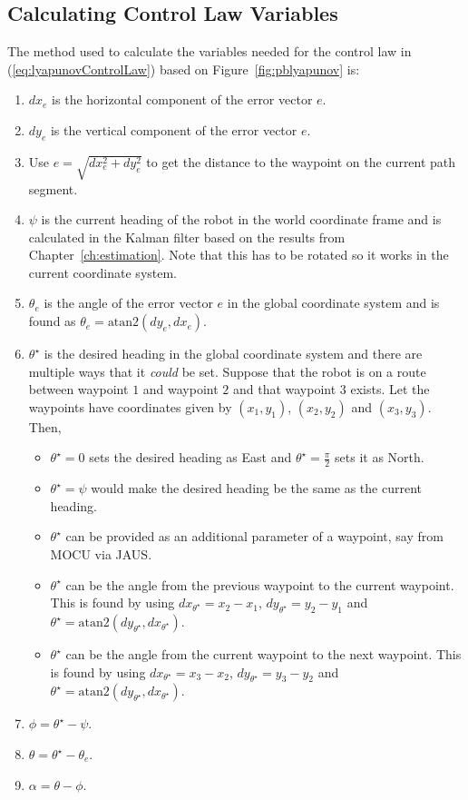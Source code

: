 \subsection{Calculating Control Law Variables}%
\label{sec:lyapunovVariables}
The method used to calculate the variables needed for the control law in (\ref{eq:lyapunovControlLaw}) based on Figure~\ref{fig:pblyapunov} is:
\begin{enumerate}
\item $dx_e$ is the horizontal component of the error vector $e$.
\item $dy_e$ is the vertical component of the error vector $e$.
\item Use $e = \sqrt{dx_e^2 + dy_e^2}$ to get the distance to the waypoint on the current path segment.
\item $\psi$ is the current heading of the robot in the world coordinate frame and is calculated in the Kalman filter based on the results from Chapter~\ref{ch:estimation}.
      Note that this has to be rotated so it works in the current coordinate system.
\item $\theta_e$ is the angle of the error vector $e$ in the global coordinate system and is found as $\theta_e = \text{atan2}(dy_e,dx_e)$.
\item $\theta^\star$ is the desired heading in the global coordinate system and there are multiple ways that it \textit{could} be set.
      Suppose that the robot is on a route between waypoint $1$ and waypoint $2$ and that waypoint $3$ exists.
      Let the waypoints have coordinates given by $(x_1,y_1)$, $(x_2,y_2)$ and $(x_3,y_3)$.
      Then,
\begin{itemize}
\item $\theta^\star=0$ sets the desired heading as East and $\theta^\star=\frac{\pi}{2}$ sets it as North.
\item $\theta^\star=\psi$ would make the desired heading be the same as the current heading.
\item $\theta^\star$ can be provided as an additional parameter of a waypoint, say from MOCU via JAUS\@.
\item $\theta^\star$ can be the angle from the previous waypoint to the current waypoint.
      This is found by using $dx_{\theta^\star}=x_2-x_1$, $dy_{\theta^\star}=y_2-y_1$ and $\theta^\star=\text{atan2}(dy_{\theta^\star},dx_{\theta^\star})$.
\item $\theta^\star$ can be the angle from the current waypoint to the next waypoint.
      This is found by using $dx_{\theta^\star}=x_3-x_2$, $dy_{\theta^\star}=y_3-y_2$ and $\theta^\star=\text{atan2}(dy_{\theta^\star},dx_{\theta^\star})$.
\end{itemize}
\item $\phi=\theta^\star-\psi$.
\item $\theta=\theta^\star - \theta_e$.
\item $\alpha = \theta - \phi$.
\end{enumerate}

